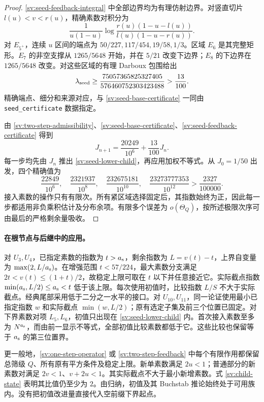 \begin{proof}
\eqref{sv:seed-feedback-integral} 中全部边界均为有理仿射边界。对竖直切片 $l(u)<v<r(u)$，精确素数对积分为
\[
 \frac1{u(1-u)}
 \log\frac{r(u)(1-u-l(u))}{l(u)(1-u-r(u))}.
\]
对 $E_{5^+}$，连续 $u$ 区间的端点为 $50/227,117/454,19/58,1/3$。区域 $E_6$ 是其完整矩形。$E_7$ 的非空支撑从 $1265/5648$ 开始，并在 $5/21$ 改变下边界；$E_8$ 的下边界在 $1265/5648$ 改变。对这些区域的有理 Darboux 包围给出
\begin{equation}\label{sv:seed-feedback-certificate}
 \lambda_{\rm seed}\ge
 \frac{75057365825327405}{576460752303423488}
 >\frac{13}{100}.
\end{equation}
精确端点、细分和来源对应，与 \eqref{sv:seed-base-certificate} 一同由 \texttt{seed\_certificate} 数据指定。

由 \eqref{sv:two-step-admissibility}、\eqref{sv:seed-base-certificate}、\eqref{sv:seed-feedback-certificate} 得到
\[
 J_{n+1}=\frac{20249}{10^6}+\frac{13}{100}J_n.
\]
每一步均先由 $J_n$ 推出 \eqref{sv:seed-lower-child}，再应用加权不等式。从 $J_0=1/50$ 出发，四个精确值为
\[
 \frac{22849}{10^6},\quad
 \frac{2321937}{10^8},\quad
 \frac{232675181}{10^{10}},\quad
 \frac{23273777353}{10^{12}}>\frac{2327}{100000}.
\]
接入素数的操作只有有限次。所有紧区域选择固定后，其指数始终为正，因此每一步都适用非负乘积估计及分布余项。有限多个误差为 $o(\Theta_Q)$，按所述极限次序可由最后的严格剩余量吸收。
\end{proof}

\paragraph{在根节点与后继中的应用。}
对 $U_3,U_4$，已指定素数的指数为 $t>{a_{\rm s}}$，剩余指数为 $L=v(t)-t$，上界自变量为 $\max(2,L/{a_{\rm s}})$。在增强范围 $t<57/224$，最大素数分支满足 $2t<v(t)\le(1+t)/2$，故稳定上限可取在 $t$ 以下并任意接近它。实际截点指数 $\min({a_{\rm s}},L/2)\le {a_{\rm s}}<t$ 低于该上限。每次使用初值时，比较指数 $L/S$ 不大于实际截点。经典尾部采用低于二分之一水平的接口。对 $U_{10},U_{11}$，同一论证使用最小已指定指数 $w$ 和实际截点 $\min(w,L/2)$；原有选定子集及前三个位置已固定。对下界素数对项 $L_5,L_6$，初值只出现在 \eqref{sv:seed-lower-child} 内。首次接入素数至多为 $N^{a_{\rm s}}$，而由前一显示不等式，全部初值比较素数都低于它。这些比较也保留等于 ${a_{\rm s}}$ 的第三位置界。

更一般地，\eqref{sv:one-step-operator} 或 \eqref{sv:two-step-feedback} 中每个有限作用都保留总筛级 $Q$、所有原有平方条件及稳定上限。新单素数满足 $2u<1$；普通部分的新素数对满足 $2v<1$、$v+2u<1$。其实际截点不大于最小新增素数。式 \eqref{sv:child-state} 表明其比值仍至少为 $2$。由归纳，初值及其 Buchstab 推论始终处于可用族内。没有把初值改进量直接代入空前缀下界起点。

